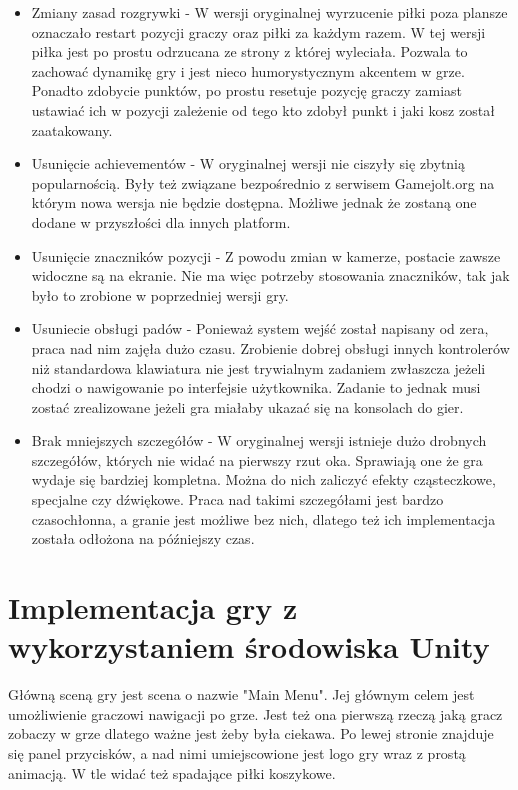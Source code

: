 \documentclass[a4paper,12pt,twoside,openany]{report}
\begin{document}
\begin{itemize}
    \item Zmiany zasad rozgrywki - W wersji oryginalnej wyrzucenie piłki poza plansze oznaczało restart pozycji graczy oraz piłki za każdym razem. W tej wersji piłka jest po prostu odrzucana ze strony z której wyleciała. Pozwala to zachować dynamikę gry i jest nieco humorystycznym akcentem w grze. Ponadto zdobycie punktów, po prostu resetuje pozycję graczy zamiast ustawiać ich w pozycji zależenie od tego kto zdobył punkt i jaki kosz został zaatakowany.
    \item Usunięcie achievementów - W oryginalnej wersji nie ciszyły się zbytnią popularnością. Były też związane bezpośrednio z serwisem Gamejolt.org na którym nowa wersja nie będzie dostępna. Możliwe jednak że zostaną one dodane w przyszłości dla innych platform.
    \item Usunięcie znaczników pozycji - Z powodu zmian w kamerze, postacie zawsze widoczne są na ekranie. Nie ma więc potrzeby stosowania znaczników, tak jak było to zrobione w poprzedniej wersji gry.  
    \item Usuniecie obsługi padów - Ponieważ system wejść został napisany od zera, praca nad nim zajęła dużo czasu. Zrobienie dobrej obsługi innych kontrolerów niż standardowa klawiatura nie jest trywialnym zadaniem zwłaszcza jeżeli chodzi o nawigowanie po interfejsie użytkownika. Zadanie to jednak musi zostać zrealizowane jeżeli gra miałaby ukazać się na konsolach do gier.
    \item Brak mniejszych szczegółów - W oryginalnej wersji istnieje dużo drobnych szczegółów, których nie widać na pierwszy rzut oka. Sprawiają one że gra wydaje się bardziej kompletna. Można do nich zaliczyć efekty cząsteczkowe, specjalne czy dźwiękowe. Praca nad takimi szczegółami jest bardzo czasochłonna, a granie jest możliwe bez nich, dlatego też ich implementacja została odłożona na późniejszy czas.
\end{itemize}

\section{Implementacja gry z wykorzystaniem środowiska Unity}
Główną sceną gry jest scena o nazwie "Main Menu". Jej głównym celem jest umożliwienie graczowi nawigacji po grze. Jest też ona pierwszą rzeczą jaką gracz zobaczy w grze dlatego ważne jest żeby była ciekawa. Po lewej stronie znajduje się panel przycisków, a nad nimi umiejscowione jest logo gry wraz z prostą animacją. W tle widać też spadające piłki koszykowe.
\end{document}
